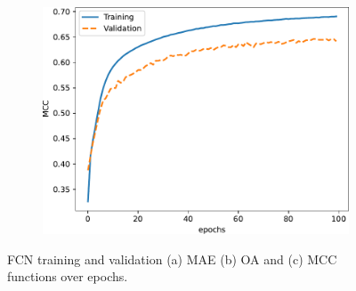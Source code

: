 \documentclass[journal,article,submit,pdftex,moreauthors]{Definitions/mdpi}
\begin{document}
\begin{figure}[H]
\begin{subfigure}[t]{0.3\linewidth}
		\includegraphics[width=\linewidth]{figures/classification_results/fcn_mcc.pdf}
    \caption{}
	\label{fig:fcn_mcc}
	\end{subfigure}
	\caption{FCN training and validation (a) MAE (b) OA and (c) MCC functions over epochs.}
	\label{fcn_losses}
\end{figure}
\end{document}
